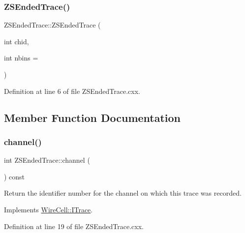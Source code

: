 \subsubsection{\texorpdfstring{Z\+S\+Ended\+Trace()}{ZSEndedTrace()}}
{\footnotesize\ttfamily Z\+S\+Ended\+Trace\+::\+Z\+S\+Ended\+Trace (\begin{DoxyParamCaption}\item[{int}]{chid,  }\item[{int}]{nbins = {} }\end{DoxyParamCaption})}



Definition at line 6 of file Z\+S\+Ended\+Trace.\+cxx.



\subsection{Member Function Documentation}
\mbox{\label{class_wire_cell_1_1_z_s_ended_trace_ac873750a7a0d47c320050561e8608a0a}} 
\subsubsection{\texorpdfstring{channel()}{channel()}}
{\footnotesize\ttfamily int Z\+S\+Ended\+Trace\+::channel (\begin{DoxyParamCaption}{ }\end{DoxyParamCaption}) const\hspace{0.3cm}{\ttfamily [virtual]}}

Return the identifier number for the channel on which this trace was recorded. 

Implements \hyperlink{class_wire_cell_1_1_i_trace_ae5903cdd197baf3b0ea67d80685851cb}{Wire\+Cell\+::\+I\+Trace}.



Definition at line 19 of file Z\+S\+Ended\+Trace.\+cxx.

\mbox{\label{class_wire_cell_1_1_z_s_ended_trace_ab2434cf1397e2bc111fd44ffd0afe75e}} 
